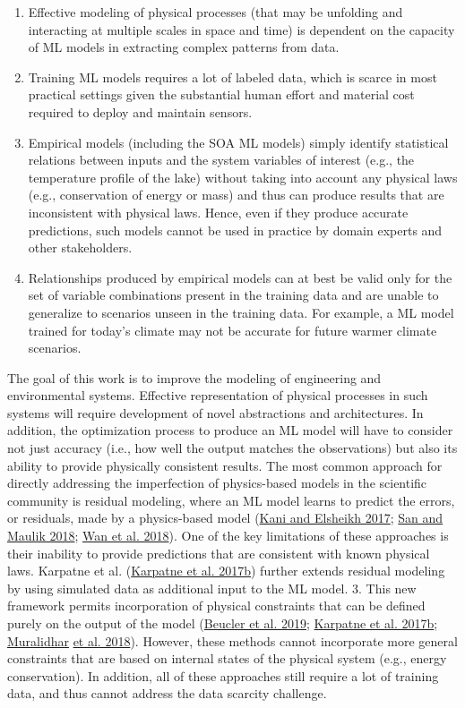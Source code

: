 \documentclass[book.tex]{subfiles}
\begin{document}
\begin{enumerate}
\item Effective modeling of physical
processes (that may be unfolding and interacting at multiple scales in space and time) is dependent on the capacity of ML models in extracting complex patterns from data. 
\item Training ML models requires a lot of
labeled data, which is scarce in most practical settings given the substantial human effort and material cost required to deploy and maintain sensors. 
\item Empirical models (including the SOA ML models)
simply identify statistical relations between inputs and the system variables of interest (e.g., the temperature profile of the lake) without taking into account any physical laws (e.g., conservation of energy or mass) and thus can produce results that are inconsistent with physical laws. Hence, even if they produce accurate predictions, such models cannot be used in practice by domain experts and other
stakeholders. 
\item Relationships produced by empirical models can at best
be valid only for the set of variable combinations present in the training data and are unable to generalize to scenarios unseen in the training data. For example, a ML model trained for today's climate may
not be accurate for future warmer climate scenarios.
\end{enumerate}

The goal of this work is to improve the modeling of engineering and
environmental systems. Effective representation of physical processes in
such systems will require development of novel abstractions and
architectures. In addition, the optimization process to produce an ML
model will have to consider not just accuracy (i.e., how well the output
matches the observations) but also its ability to provide physically
consistent results. The most common approach for directly addressing the imperfection of physics-based models in the
scientific community is residual modeling, where an ML model learns
to predict the errors, or residuals, made by a physics-based model
(\protect\hyperlink{page23}{Kani and Elsheikh 2017};
\protect\hyperlink{page24}{San and} \protect\hyperlink{page24}{Maulik
2018}; \protect\hyperlink{page24}{Wan et al. 2018}). One of the key
limitations of these approaches is their inability to provide
predictions that are consistent with known physical laws. Karpatne et
al. (\protect\hyperlink{page23}{Karpatne et al. 2017b}) further extends
residual modeling by using simulated data as additional input to the ML
model. 3. This new framework permits incorporation of physical
constraints that can be defined purely on the output of the model
(\protect\hyperlink{page22}{Beucler et al. 2019};
\protect\hyperlink{page23}{Karpatne et al. 2017b};
\protect\hyperlink{page24}{Muralidhar} \protect\hyperlink{page24}{et al.
2018}). However, these methods cannot incorporate more general
constraints that are based on internal states of the physical system
(e.g., energy conservation). In addition, all of these approaches still
require a lot of training data, and thus cannot address the data
scarcity challenge.
\end{document}
